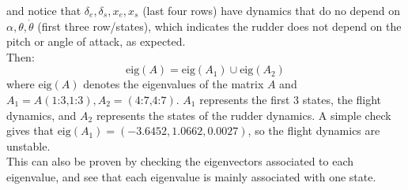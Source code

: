 and notice that $\delta_e,\delta_s, x_e, x_s$ (last four rows) have dynamics that do no depend on $\alpha, \theta, \dot{\theta} $ (first three row/states), which indicates the rudder does not depend on the pitch or angle of attack, as expected. \\Then:
$$\textrm{eig}(A) = \textrm{eig}(A_1)\cup \textrm{eig}(A_2)$$
where $\textrm{eig}(A)$ denotes the eigenvalues of the matrix $A$ and $A_1 =A(\text{1:3,1:3}), A_2=(\text{4:7,4:7})$. $A_1$ represents the first 3 states, the flight dynamics, and $A_2$ represents the states of the rudder dynamics. A simple check gives that $\textrm{eig}(A_1)= (-3.6452,1.0662,0.0027)$, so the flight dynamics are unstable. \\ This can also be proven by checking the eigenvectors associated to each eigenvalue, and see that each eigenvalue is mainly associated with one state.